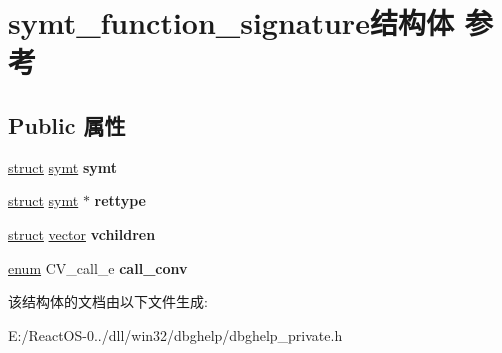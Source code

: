 \hypertarget{structsymt__function__signature}{}\section{symt\+\_\+function\+\_\+signature结构体 参考}
\label{structsymt__function__signature}
\subsection*{Public 属性}
\begin{DoxyCompactItemize}
\item 
\mbox{\label{structsymt__function__signature_a02f7bcd4629a82438bc783b552310f6a}} 
\hyperlink{interfacestruct}{struct} \hyperlink{structsymt}{symt} {\bfseries symt}
\item 
\mbox{\label{structsymt__function__signature_adabb11aa2fbf53f3fd11703dac27922a}} 
\hyperlink{interfacestruct}{struct} \hyperlink{structsymt}{symt} $\ast$ {\bfseries rettype}
\item 
\mbox{\label{structsymt__function__signature_a124ccfcbf8f7cdb240539994206a50e0}} 
\hyperlink{interfacestruct}{struct} \hyperlink{structvector}{vector} {\bfseries vchildren}
\item 
\mbox{\label{structsymt__function__signature_a41551dee85c41fca016f53a37b8548e6}} 
\hyperlink{interfaceenum}{enum} C\+V\+\_\+call\+\_\+e {\bfseries call\+\_\+conv}
\end{DoxyCompactItemize}


该结构体的文档由以下文件生成\+:\begin{DoxyCompactItemize}
\item 
E\+:/\+React\+O\+S-\/0../dll/win32/dbghelp/dbghelp\+\_\+private.\+h\end{DoxyCompactItemize}
